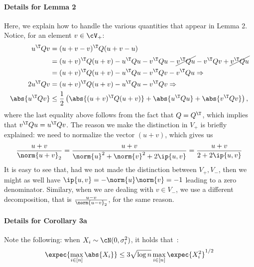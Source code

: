 \documentclass[a4paper]{article}
\begin{document}
\paragraph{Details for Lemma 2}
Here, we explain how to handle the various quantities that appear in Lemma 2.
Notice, for an element $v \in \cV_+$:
\begin{align*}
	u^\T Q v &= (u + v - v)^\T Q (u + v - u) \\
		&= (u + v)^\T Q (u + v) - u^\T Q u - v^\T Q u
		 - \cancel{v^\T Q u} - v^\T Q v + \cancel{v^\T Q u} \\
		&= (u + v)^\T Q (u + v) - u^\T Q u - v^\T Q v - v^\T Q u \Rightarrow \\
	2 u^\T Q v &= (u + v)^\T Q (u + v) - u^\T Q u - v^\T Q v \Rightarrow \\
	\abs{u^\T Q v} &\leq \frac{1}{2} \left(
		\abs{(u + v)^\T Q (u + v)} + \abs{u^\T Q u} + \abs{v^\T Q v}
	\right),
\end{align*}
where the last equality above follows from the fact that $Q = Q^\T$, which
implies that $v^\T Q u = u^\T Q v$. The reason we make the distinction in $V_+$
is briefly explained: we need to normalize the vector $(u + v)$, which gives us
\[
	\frac{u + v}{\norm{u + v}_2} =
	\frac{u + v}{\norm{u}^2 + \norm{v}^2 + 2 \ip{u, v}} =
	\frac{u + v}{2 + 2 \ip{u, v}}
\]
It is easy to see that, had we not made the distinction between $V_+, V_-$,
then we might as well have $\ip{u, v} = -\norm{u} \norm{v} = -1$ leading to a
zero denominator. Similary, when we are dealing with $v \in V_-$, we use a
different decomposition, that is $\frac{u - v}{\norm{u - v}_2}$, for the same
reason.

\paragraph{Details for Corollary 3a}
Note the following: when $X_i \sim \cN(0, \sigma_i^2)$, it holds
that~\cite[Eq. (3.13)]{LedTal13}:
\begin{equation}
    \expec{\max_{i \in [n]} \abs{X_i}} \leq 3 \sqrt{\log n} \max_{i \in [n]}
    \expec{X_i^2}^{1/2}
    \label{eq:expected_sup_gaussian}
\end{equation}
\end{document}
